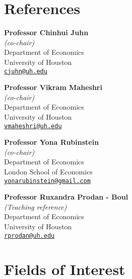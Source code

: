 \documentclass[10pt,letterpaper]{article}
\begin{document}
\section*{References}

\begin{minipage}[t]{0.5\textwidth}
  \textbf{Professor Chinhui Juhn}  \\
  \textit{(co-chair)}  \\
                   Department of Economics \\
                   University of Houston  \\
                   \href{mailto:cjuhn@uh.edu}{\tt cjuhn@uh.edu} \\
\end{minipage}
\begin{minipage}[t]{0.5\textwidth}
   \textbf{Professor Vikram Maheshri}  \\
   \textit{(co-chair)}  \\
                   Department of Economics \\
                   University of Houston  \\
                   \href{mailto:vmaheshri@uh.edu}{\tt vmaheshri@uh.edu} \\
\end{minipage}


\begin{minipage}[t]{0.5\textwidth}
   \textbf{Professor Yona Rubinstein}  \\
   \textit{(co-chair)}  \\
                   Department of Economics \\
                   London School of Economics  \\
                   \href{mailto:yonarubinstein@gmail.com}{\tt yonarubinstein@gmail.com} \\
\end{minipage}
\begin{minipage}[t]{0.5\textwidth}
  \textbf{Professor Ruxandra Prodan - Boul} \\
  \textit{(Teaching reference)}  \\
                   Department of Economics \\
                   University of Houston  \\
                   \href{mailto:rprodan@uh.edu}{\tt rprodan@uh.edu} \\
\end{minipage}


\section*{Fields of Interest}
\end{document}
